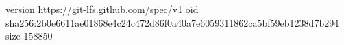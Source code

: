 version https://git-lfs.github.com/spec/v1
oid sha256:2b0e6611ae01868e4c24c472d86f0a40a7e6059311862ca5bf59eb1238d7b294
size 158850
